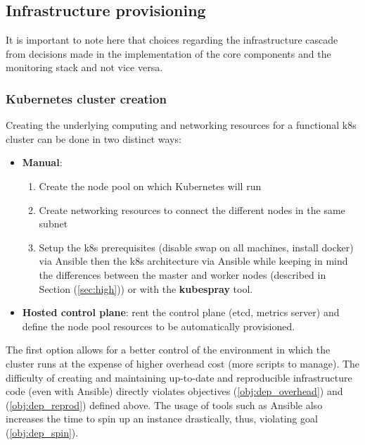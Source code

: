 \documentclass[11pt]{article}
\begin{document}

\subsection{Infrastructure provisioning}

\hspace{5mm} It is important to note here that choices regarding the infrastructure cascade from decisions made in the implementation of the core components and the monitoring stack and not vice versa. 

\subsubsection{Kubernetes cluster creation}

\hspace{5mm} Creating the underlying computing and networking resources for a functional k8s cluster can be done in two distinct ways:

\begin{itemize}
    \item \textbf{Manual}: 
    \begin{enumerate}
        \item Create the node pool on which Kubernetes will run
        \item Create networking resources to connect the different nodes in the same subnet
        \item Setup the k8s prerequisites (disable swap on all machines, install docker) via Ansible then the k8s architecture via Ansible while keeping in mind the differences between the master and worker nodes (described in Section (\ref{sec:high})) or with the \textbf{kubespray} tool.
    \end{enumerate}
    \item \textbf{Hosted control plane}: rent the control plane (etcd, metrics server) and define the node pool resources to be automatically provisioned. 
\end{itemize}

The first option allows for a better control of the environment in which the cluster runs at the expense of higher overhead cost (more scripts to manage). The difficulty of creating and maintaining up-to-date and reproducible infrastructure code (even with Ansible) directly violates objectives (\ref{obj:dep_overhead}) and (\ref{obj:dep_reprod}) defined above. The usage of tools such as Ansible also increases the time to spin up an instance drastically, thus, violating goal (\ref{obj:dep_spin}). 
\end{document}
